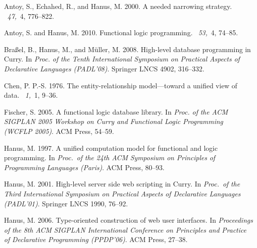 \documentclass{tlp}
\begin{document}
\begin{thebibliography}{}

{\sc Antoy, S.}, {\sc Echahed, R.}, {\sc and} {\sc Hanus, M.} 2000.
\newblock A needed narrowing strategy.
~{\em 47,\/}~4, 776--822.

{\sc Antoy, S.} {\sc and} {\sc Hanus, M.} 2010.
\newblock Functional logic programming.
~{\em 53,\/}~4, 74--85.

{\sc Bra{\ss}el, B.}, {\sc Hanus, M.}, {\sc and} {\sc M{\"u}ller, M.} 2008.
\newblock High-level database programming in {Curry}.
\newblock In {\em Proc. of the Tenth International Symposium on Practical
  Aspects of Declarative Languages (PADL'08)}. Springer LNCS 4902, 316--332.

{\sc Chen, P. P.-S.} 1976.
\newblock The entity-relationship model---toward a unified view of data.
~{\em 1,\/}~1, 9--36.

{\sc Fischer, S.} 2005.
\newblock A functional logic database library.
\newblock In {\em Proc. of the ACM SIGPLAN 2005 Workshop on Curry and
  Functional Logic Programming (WCFLP 2005)}. ACM Press, 54--59.

{\sc Hanus, M.} 1997.
\newblock A unified computation model for functional and logic programming.
\newblock In {\em Proc.\ of the 24th ACM Symposium on Principles of Programming
  Languages (Paris)}. ACM Press, 80--93.

{\sc Hanus, M.} 2001.
\newblock High-level server side web scripting in {Curry}.
\newblock In {\em Proc.\ of the Third International Symposium on Practical
  Aspects of Declarative Languages (PADL'01)}. Springer LNCS 1990, 76--92.

{\sc Hanus, M.} 2006.
\newblock Type-oriented construction of web user interfaces.
\newblock In {\em Proceedings of the 8th ACM SIGPLAN International Conference
  on Principles and Practice of Declarative Programming (PPDP'06)}. ACM Press,
  27--38.


\end{thebibliography}
\end{document}
